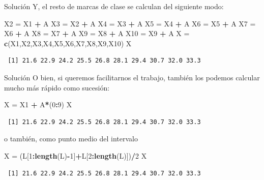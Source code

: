 \documentclass[
  ignorenonframetext,
  aspectratio=169]{beamer}
\newenvironment{Shaded}{\begin{snugshade}}{\end{snugshade}}
\newcommand{\DecValTok}[1]{\textcolor[rgb]{0.00,0.00,0.81}{#1}}
\newcommand{\FunctionTok}[1]{\textcolor[rgb]{0.13,0.29,0.53}{\textbf{#1}}}
\newcommand{\NormalTok}[1]{#1}
\newcommand{\OtherTok}[1]{\textcolor[rgb]{0.56,0.35,0.01}{#1}}
\newcommand{\SpecialCharTok}[1]{\textcolor[rgb]{0.81,0.36,0.00}{\textbf{#1}}}
\begin{document}
\begin{frame}[fragile]{Solución}
\label{soluciuxf3n-9}
Y, el resto de marcas de clase se calculan del siguiente modo:

\begin{Shaded}
\begin{Highlighting}[]
\NormalTok{X2 }\OtherTok{=}\NormalTok{ X1 }\SpecialCharTok{+}\NormalTok{ A}
\NormalTok{X3 }\OtherTok{=}\NormalTok{ X2 }\SpecialCharTok{+}\NormalTok{ A}
\NormalTok{X4 }\OtherTok{=}\NormalTok{ X3 }\SpecialCharTok{+}\NormalTok{ A}
\NormalTok{X5 }\OtherTok{=}\NormalTok{ X4 }\SpecialCharTok{+}\NormalTok{ A}
\NormalTok{X6 }\OtherTok{=}\NormalTok{ X5 }\SpecialCharTok{+}\NormalTok{ A}
\NormalTok{X7 }\OtherTok{=}\NormalTok{ X6 }\SpecialCharTok{+}\NormalTok{ A}
\NormalTok{X8 }\OtherTok{=}\NormalTok{ X7 }\SpecialCharTok{+}\NormalTok{ A}
\NormalTok{X9 }\OtherTok{=}\NormalTok{ X8 }\SpecialCharTok{+}\NormalTok{ A}
\NormalTok{X10 }\OtherTok{=}\NormalTok{ X9 }\SpecialCharTok{+}\NormalTok{ A}
\NormalTok{X }\OtherTok{=} \FunctionTok{c}\NormalTok{(X1,X2,X3,X4,X5,X6,X7,X8,X9,X10)}
\NormalTok{X}
\end{Highlighting}
\end{Shaded}

\begin{verbatim}
 [1] 21.6 22.9 24.2 25.5 26.8 28.1 29.4 30.7 32.0 33.3
\end{verbatim}
\end{frame}

\begin{frame}[fragile]{Solución}
\label{soluciuxf3n-10}
O bien, si queremos facilitarnos el trabajo, también los podemos
calcular mucho más rápido como sucesión:

\begin{Shaded}
\begin{Highlighting}[]
\NormalTok{X }\OtherTok{=}\NormalTok{ X1 }\SpecialCharTok{+}\NormalTok{ A}\SpecialCharTok{*}\NormalTok{(}\DecValTok{0}\SpecialCharTok{:}\DecValTok{9}\NormalTok{)}
\NormalTok{X}
\end{Highlighting}
\end{Shaded}

\begin{verbatim}
 [1] 21.6 22.9 24.2 25.5 26.8 28.1 29.4 30.7 32.0 33.3
\end{verbatim}

o también, como punto medio del intervalo

\begin{Shaded}
\begin{Highlighting}[]
\NormalTok{X }\OtherTok{=}\NormalTok{ (L[}\DecValTok{1}\SpecialCharTok{:}\FunctionTok{length}\NormalTok{(L)}\SpecialCharTok{{-}}\DecValTok{1}\NormalTok{]}\SpecialCharTok{+}\NormalTok{L[}\DecValTok{2}\SpecialCharTok{:}\FunctionTok{length}\NormalTok{(L)])}\SpecialCharTok{/}\DecValTok{2}
\NormalTok{X}
\end{Highlighting}
\end{Shaded}

\begin{verbatim}
 [1] 21.6 22.9 24.2 25.5 26.8 28.1 29.4 30.7 32.0 33.3
\end{verbatim}
\end{frame}
\end{document}
